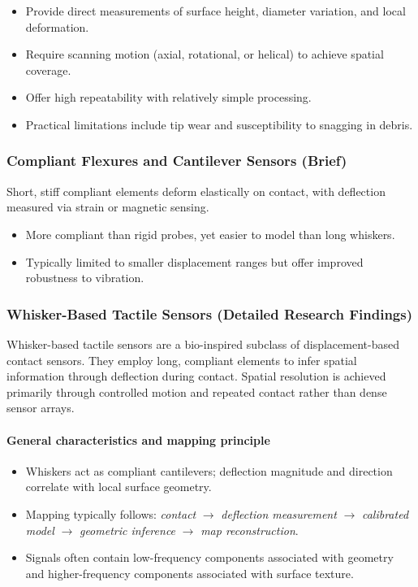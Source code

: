 \documentclass[11pt,a4paper]{article}
\begin{document}
\begin{itemize}
    \item Provide direct measurements of surface height, diameter variation, and local deformation.
    \item Require scanning motion (axial, rotational, or helical) to achieve spatial coverage.
    \item Offer high repeatability with relatively simple processing.
    \item Practical limitations include tip wear and susceptibility to snagging in debris.
\end{itemize}

\subsubsection{Compliant Flexures and Cantilever Sensors (Brief)}

Short, stiff compliant elements deform elastically on contact, with deflection measured via strain or magnetic sensing.

\begin{itemize}
    \item More compliant than rigid probes, yet easier to model than long whiskers.
    \item Typically limited to smaller displacement ranges but offer improved robustness to vibration.
\end{itemize}

\subsubsection{Whisker-Based Tactile Sensors (Detailed Research Findings)}

Whisker-based tactile sensors are a bio-inspired subclass of displacement-based contact sensors. They employ long, compliant elements to infer spatial information through deflection during contact. Spatial resolution is achieved primarily through controlled motion and repeated contact rather than dense sensor arrays.

\paragraph{General characteristics and mapping principle}
\begin{itemize}
    \item Whiskers act as compliant cantilevers; deflection magnitude and direction correlate with local surface geometry.
    \item Mapping typically follows: \emph{contact} $\rightarrow$ \emph{deflection measurement} $\rightarrow$ \emph{calibrated model} $\rightarrow$ \emph{geometric inference} $\rightarrow$ \emph{map reconstruction}.
    \item Signals often contain low-frequency components associated with geometry and higher-frequency components associated with surface texture.
\end{itemize}
\end{document}
